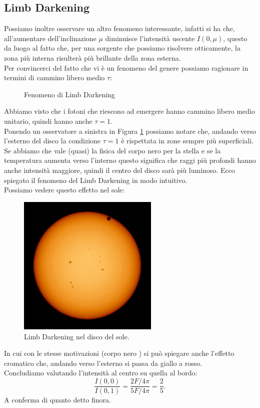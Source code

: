\subsection{Limb Darkening}%
Possiamo inoltre osservare un altro fenomeno interessante, infatti si ha che, all'aumentare dell'inclinazione $\mu $ diminuisce l'intensità uscente $I( 0, \mu ) $, questo da luogo al fatto che, per una sorgente che possiamo risolvere otticamente, la zona più interna risulterà più brillante della zona esterna.\\
Per convincerci del fatto che vi è un fenomeno del genere possiamo ragionare in termini di cammino libero medio $\tau $:
\begin{figure}[H]
    \centering
    \caption{\scriptsize Fenomeno di Limb Darkening}
    \label{fig:fenomeno-di-limb-darkening}
\end{figure}
\noindent
Abbiamo visto che i fotoni che riescono ad emergere hanno cammino libero medio unitario, quindi hanno anche $\tau = 1$. \\
Ponendo un osservatore a sinistra in Figura \ref{fig:fenomeno-di-limb-darkening} possiamo notare che, andando verso l'esterno del disco la condizione $\tau =1$ è rispettata in zone sempre più superficiali. Se abbiamo che vale (quasi) la fisica del corpo nero per la stella e se la temperatura aumenta verso l'interno questo significa che raggi più profondi hanno anche intensità maggiore, quindi il centro del disco sarà più luminoso. Ecco spiegato il fenomeno del Limb Darkening in modo intuitivo.\\
Possiamo vedere questo effetto nel sole:
\begin{figure}[H]
	\centering
	\includegraphics[width=0.6\textwidth]{figures/Limb.jpg}
	\caption{Limb Darkening nel disco del sole.}
	\label{fig:figures-Limb-jpg}
\end{figure}
\noindent
In cui con le stesse motivazioni (corpo nero ) si può spiegare anche l'effetto cromatico che, andando verso l'esterno si passa da giallo a rosso.\\
Concludiamo valutando l'intensità al centro su quella al bordo:
\[
	\frac{I( 0,0) }{I( 0,1) } = \frac{2F / 4\pi}{5F / 4\pi} = \frac{2}{5} 
.\] 
A conferma di quanto detto finora.
